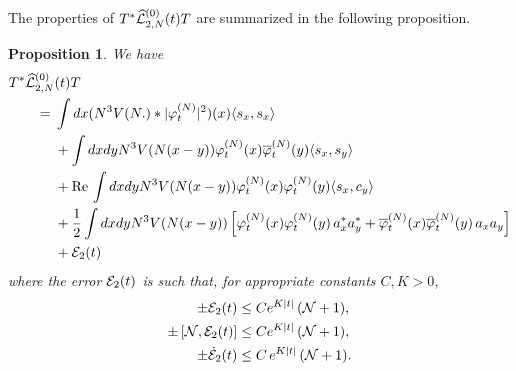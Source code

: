 \documentclass[11pt,a4paper]{article}
\newtheorem{proposition}[thm]{Proposition}
\newcommand{\ech}[2]{#2}	%
\newcommand{\ekt}{e^{K\lvert t\rvert}}	%
\newcommand{\cE}{{\cal E}}
\newcommand{\cL}{{\cal L}}
\newcommand{\cN}{{\cal N}}
\renewcommand{\Re}{\operatorname{Re}\,} 	%
\begin{document}
The properties of $T^* \widehat{\cL}_{2,N}^{(0)} (t) T$ are summarized in the following proposition.
\begin{proposition}\label{prop:TwtL2T}
We have 
\begin{equation} \begin{split} 
T^* \widehat{\cL}_{2,N}^{(0)} &(t) T \\ =\; & \int dx (N^3 V(N.) * |\varphi_t^{(N)}|^2) (x) \langle s_x , s_x \rangle \\ &+ \int dx dy N^3 V(N (x-y)) \varphi_t^{(N)} (x) \overline{\varphi}_t^{(N)} (y) \langle s_x , s_y \rangle \\ &+ \Re \int dx dy N^3 V(N (x-y)) \varphi_t^{(N)} (x) \varphi_t^{(N)} (y) \langle s_x ,c_y \rangle \\ &+ \frac{1}{2} \int dx dy N^3 V(N (x-y)) \left[ \varphi_t^{(N)} (x) \varphi_t^{(N)} (y)\, a_x^* a_y^*  + \overline{\varphi}_t^{(N)} (x) \overline{\varphi}_t^{(N)} (y) \, a_x a_y \right]  \\ &+ \cE_2 (t) \end{split} \end{equation}
where the error $\cE_2 (t)$ is such that, for appropriate constants $C,K > 0$,
\begin{equation} \label{eq:T2T-cl}
\begin{split}
\pm  \cE_2 (t) &\leq C \ech{\| \varphi_t^{(N)} \|_{H^2}^2}{\ekt} \,  (\cN + 1), \\  \pm \left[ \cN , \cE_2 (t) \right]  &\leq C \ech{\| \varphi_t^{(N)} \|_{H^2}^2}{\ekt} \, (\cN + 1), \\ \pm \dot{\cE}_2 (t) &\leq C \, \ech{\left(\| \varphi_t^{(N)} \|_{H^4} \| \varphi_t^{(N)} \|_{H^2} +   \| \varphi_t^{(N)} \|_{H^2}^3 \right)}{\ekt} \, (\cN+1) .
\end{split}
\end{equation} 
\end{proposition}
\end{document}
